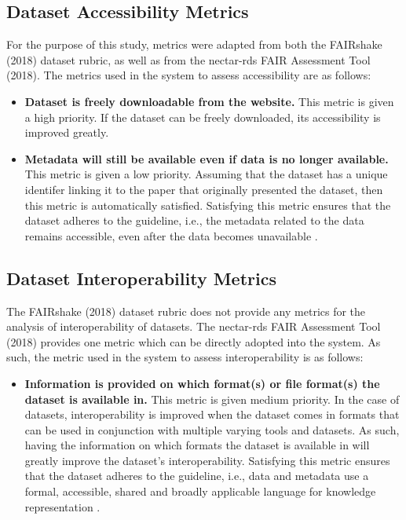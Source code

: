 \documentclass{cisfyp}
\begin{document}
\subsection{Dataset Accessibility Metrics}
For the purpose of this study, metrics were adapted from both the FAIRshake (2018) dataset rubric, as well as from the nectar-rds FAIR Assessment Tool (2018).\newline
The metrics used in the system to assess accessibility are as follows:
\begin{itemize}
	\item \textbf{Dataset is freely downloadable from the website.}\newline
	This metric is given a high priority. If the dataset can be freely downloaded, its accessibility is improved greatly.
	
	\item \textbf{Metadata will still be available even if data is no longer available.}\newline
	This metric is given a low priority. Assuming that the dataset has a unique identifer linking it to the paper that originally presented the dataset, then this metric is automatically satisfied.\newline
	Satisfying this metric ensures that the dataset adheres to the guideline, i.e., the metadata related to the data remains accessible, even after the data becomes unavailable \cite{Wilkinson2016}.
\end{itemize}
\subsection{Dataset Interoperability Metrics}
The FAIRshake (2018) dataset rubric does not provide any metrics for the analysis of interoperability of datasets. The nectar-rds FAIR Assessment Tool (2018) provides one metric which can be directly adopted into the system.\newline
As such, the metric used in the system to assess interoperability is as follows:
\begin{itemize}
	\item \textbf{Information is provided on which format(s) or file format(s) the dataset is available in.}\newline
	This metric is given medium priority. In the case of datasets, interoperability is improved when the dataset comes in formats that can be used in conjunction with multiple varying tools and datasets. As such, having the information on which formats the dataset is available in will greatly improve the dataset's interoperability.\newline
	Satisfying this metric ensures that the dataset adheres to the guideline, i.e., data and metadata use a formal, accessible, shared and broadly applicable language for knowledge representation \cite{Wilkinson2016}.
\end{itemize}
\end{document}
